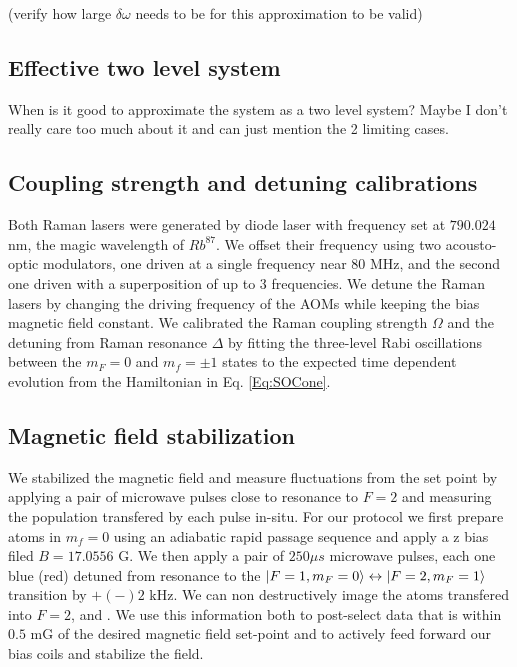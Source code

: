 (verify how large $\delta\omega$ needs to be for this approximation to be valid)
%
%
 
\subsection{Effective two level system}
When is it good to approximate the system as a two level system? Maybe I don't really care too much about it and can just mention the 2 limiting cases. 
\subsection{Coupling strength and detuning calibrations}
Both Raman lasers were generated by diode laser with frequency set at $790.024$ nm, the magic wavelength of $Rb^{87}$. We offset their frequency using two acousto-optic modulators, one driven at a single frequency near 80 MHz, and the second one driven with a superposition  of up to 3 frequencies. We detune the Raman lasers by changing the driving frequency of the AOMs while keeping the bias magnetic field constant. We calibrated the Raman coupling strength $\Omega$ and the detuning from Raman resonance $\Delta$ by fitting the three-level
Rabi oscillations between the $m_F=0$ and $m_f=\pm 1$ states to the expected time dependent evolution from the Hamiltonian in Eq. \ref{Eq:SOCone}.

\subsection{Magnetic field stabilization}
We stabilized the magnetic field and measure fluctuations from the set point by applying a pair of microwave pulses close to resonance to $F=2$ and measuring the population transfered by each pulse in-situ. For our protocol we first prepare atoms in $m_f=0$ using an adiabatic rapid passage sequence and apply a z bias filed $B=17.0556$ G. We then apply a pair of $250\mu s$ microwave pulses, each one blue (red) detuned from resonance to the $|F=1,m_F=0\rangle\leftrightarrow|F=2,m_F=1\rangle $ transition by $+(-)2$ kHz. We can non destructively image the atoms transfered into $F=2$, and . We use this information both to post-select data that is within $0.5$ mG of the desired magnetic field set-point and to actively feed forward our bias coils and stabilize the field.  


